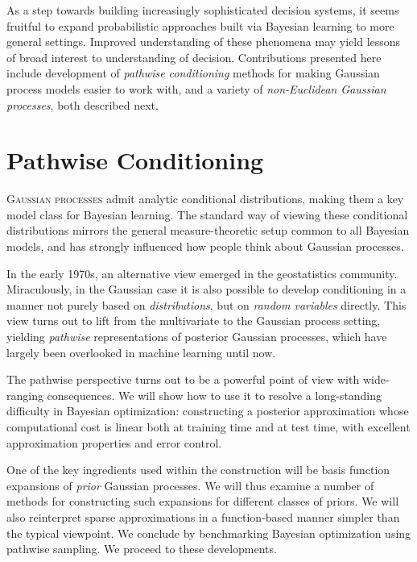 \documentclass[11pt]{book}
\begin{document}
As a step towards building increasingly sophisticated decision systems, it seems fruitful to expand probabilistic approaches built via Bayesian learning to more general settings.
Improved understanding of these phenomena may yield lessons of broad interest to understanding of decision.
Contributions presented here include development of \emph{pathwise conditioning} methods for making Gaussian process models easier to work with, and a variety of \emph{non-Euclidean Gaussian processes}, both described next.





\chapter{Pathwise Conditioning}
\label{ch:pathwise}

\lettrine{G}{aussian processes} admit analytic conditional distributions, making them a key model class for Bayesian learning.
The standard way of viewing these conditional distributions mirrors the general measure-theoretic setup common to all Bayesian models, and has strongly influenced how people think about Gaussian processes.

In the early 1970s, an alternative view emerged in the geostatistics community.
Miraculously, in the Gaussian case it is also possible to develop conditioning in a manner not purely based on \emph{distributions}, but on \emph{random variables} directly.
This view turns out to lift from the multivariate to the Gaussian process setting, yielding \emph{pathwise} representations of posterior Gaussian processes, which have largely been overlooked in machine learning until now.

The pathwise perspective turns out to be a powerful point of view with wide-ranging consequences.
We will show how to use it to resolve a long-standing difficulty in Bayesian optimization: constructing a posterior approximation whose computational cost is linear both at training time and at test time, with excellent approximation properties and error control.

One of the key ingredients used within the construction will be basis function expansions of \emph{prior} Gaussian processes.
We will thus examine a number of methods for constructing such expansions for different classes of priors.
We will also reinterpret sparse approximations in a function-based manner simpler than the typical viewpoint.
We conclude by benchmarking Bayesian optimization using pathwise sampling.
We proceed to these developments.
\end{document}
